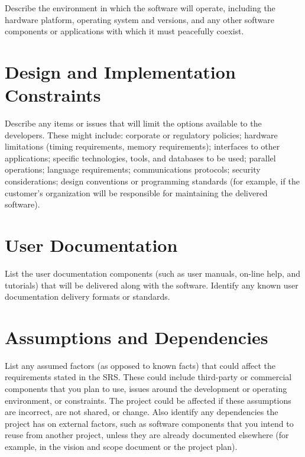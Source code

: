 Describe the environment in which the software will operate, including
the hardware platform, operating system and versions, and any other
software components or applications with which it must peacefully
coexist.

\section{Design and Implementation Constraints}

Describe any items or issues that will limit the options available to
the developers. These might include: corporate or regulatory policies;
hardware limitations (timing requirements, memory requirements);
interfaces to other applications; specific technologies, tools, and
databases to be used; parallel operations; language requirements;
communications protocols; security considerations; design conventions
or programming standards (for example, if the customer's organization
will be responsible for maintaining the delivered software).

\section{User Documentation}

List the user documentation components (such as user manuals, on-line
help, and tutorials) that will be delivered along with the
software. Identify any known user documentation delivery formats or
standards.

\section{Assumptions and Dependencies}

List any assumed factors (as opposed to known facts) that could affect
the requirements stated in the SRS. These could include third-party or
commercial components that you plan to use, issues around the
development or operating environment, or constraints. The project
could be affected if these assumptions are incorrect, are not shared,
or change. Also identify any dependencies the project has on external
factors, such as software components that you intend to reuse from
another project, unless they are already documented elsewhere (for
example, in the vision and scope document or the project plan).
